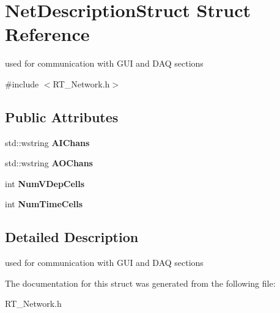 \hypertarget{struct_net_description_struct}{\section{Net\+Description\+Struct Struct Reference}
\label{struct_net_description_struct}
}


used for communication with G\+U\+I and D\+A\+Q sections  




{\ttfamily \#include $<$R\+T\+\_\+\+Network.\+h$>$}

\subsection*{Public Attributes}
\begin{DoxyCompactItemize}
\item 
\hypertarget{struct_net_description_struct_adcaadbd56a486f45a2a76496ac0bad9d}{std\+::wstring {\bfseries A\+I\+Chans}}\label{struct_net_description_struct_adcaadbd56a486f45a2a76496ac0bad9d}

\item 
\hypertarget{struct_net_description_struct_aa332faceb8a357fe11ff3127850cc956}{std\+::wstring {\bfseries A\+O\+Chans}}\label{struct_net_description_struct_aa332faceb8a357fe11ff3127850cc956}

\item 
\hypertarget{struct_net_description_struct_aa7711975fe6c8618c5bd360ae6c4303a}{int {\bfseries Num\+V\+Dep\+Cells}}\label{struct_net_description_struct_aa7711975fe6c8618c5bd360ae6c4303a}

\item 
\hypertarget{struct_net_description_struct_a178764beaed428b54d6b9629420421de}{int {\bfseries Num\+Time\+Cells}}\label{struct_net_description_struct_a178764beaed428b54d6b9629420421de}

\end{DoxyCompactItemize}


\subsection{Detailed Description}
used for communication with G\+U\+I and D\+A\+Q sections 

The documentation for this struct was generated from the following file\+:\begin{DoxyCompactItemize}
\item 
R\+T\+\_\+\+Network.\+h\end{DoxyCompactItemize}

